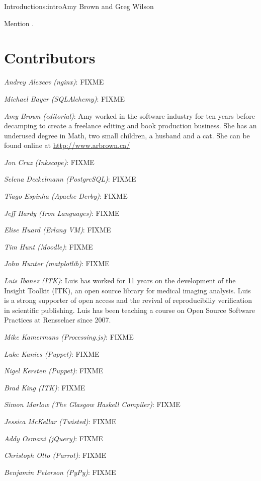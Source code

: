\begin{aosachapter}{Introduction}{s:intro}{Amy Brown and Greg Wilson}

Mention \cite{bib:aosa1}.

\section*{Contributors}

\emph{Andrey Alexeev (nginx)}: FIXME

\emph{Michael Bayer (SQLAlchemy)}: FIXME

\emph{Amy Brown (editorial)}: Amy worked in the software industry for
ten years before decamping to create a freelance editing and book production
business. She has an underused degree in Math, two small children, a
husband and a cat. She can be found online at \url{http://www.arbrown.ca/}

\emph{Jon Cruz (Inkscape)}: FIXME

\emph{Selena Deckelmann (PostgreSQL)}: FIXME

\emph{Tiago Espinha (Apache Derby)}: FIXME

\emph{Jeff Hardy (Iron Languages)}: FIXME

\emph{Elise Huard (Erlang VM)}: FIXME

\emph{Tim Hunt (Moodle)}: FIXME

\emph{John Hunter (matplotlib)}: FIXME

\emph{Luis Ibanez (ITK)}: Luis has worked for 11 years on the development of
the Insight Toolkit (ITK), an open source library for medical imaging analysis.
Luis is a strong supporter of open access and the revival of reproducibiliy
verification in scientific publishing. Luis has been teaching a course on Open
Source Software Practices at Rensselaer since 2007.

\emph{Mike Kamermans (Processing.js)}: FIXME

\emph{Luke Kanies (Puppet)}: FIXME

\emph{Nigel Kersten (Puppet)}: FIXME

\emph{Brad King (ITK)}: FIXME

\emph{Simon Marlow (The Glasgow Haskell Compiler)}: FIXME

\emph{Jessica McKellar (Twisted)}: FIXME

\emph{Addy Osmani (jQuery)}: FIXME

\emph{Christoph Otto (Parrot)}: FIXME

\emph{Benjamin Peterson (PyPy)}: FIXME


\end{aosachapter}
